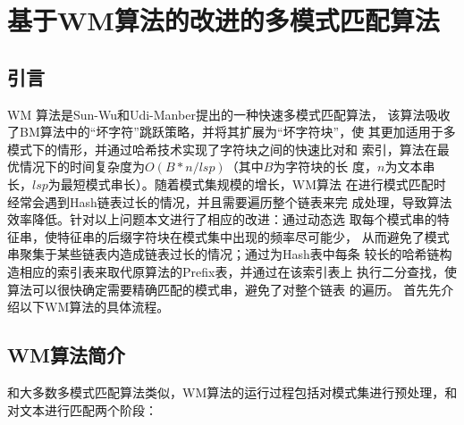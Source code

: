 \chapter{基于WM算法的改进的多模式匹配算法}

\section{引言}
\label{sec:5_introduction}

WM \cite{Wu1994} 算法是Sun-Wu和Udi-Manber提出的一种快速多模式匹配算法，
该算法吸收了BM算法中的“坏字符”跳跃策略，并将其扩展为“坏字符块”，使
其更加适用于多模式下的情形，并通过哈希技术实现了字符块之间的快速比对和
索引，算法在最优情况下的时间复杂度为$O(B*n/lsp)$（其中$B$为字符块的长
度，$n$为文本串长，$lsp$为最短模式串长）。随着模式集规模的增长，WM算法
在进行模式匹配时经常会遇到Hash链表过长的情况，并且需要遍历整个链表来完
成处理，导致算法效率降低。针对以上问题本文进行了相应的改进：通过动态选
取每个模式串的特征串，使特征串的后缀字符块在模式集中出现的频率尽可能少，
从而避免了模式串聚集于某些链表内造成链表过长的情况；通过为Hash表中每条
较长的哈希链构造相应的索引表来取代原算法的Prefix表，并通过在该索引表上
执行二分查找，使算法可以很快确定需要精确匹配的模式串，避免了对整个链表
的遍历。 首先先介绍以下WM算法的具体流程。


\section{WM算法简介}
\label{sec:5_WM}

和大多数多模式匹配算法类似，WM算法的运行过程包括对模式集进行预处理，和
对文本进行匹配两个阶段：

